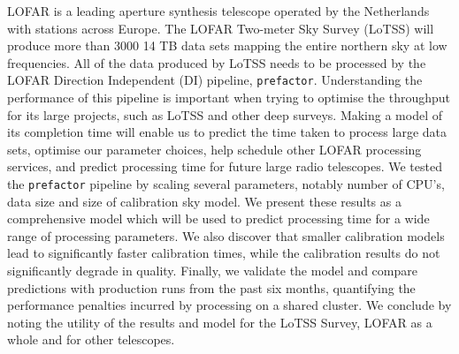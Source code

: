 
LOFAR is a leading aperture synthesis telescope operated by the Netherlands with stations across Europe. The LOFAR Two-meter Sky Survey (LoTSS) will produce more than 3000 14 TB data sets mapping the entire northern sky at low frequencies. All of the data produced by LoTSS needs to be processed by the LOFAR Direction Independent (DI) pipeline, \texttt{prefactor}. Understanding the performance of this pipeline is important when trying to optimise the throughput for its large projects, such as LoTSS and other deep surveys. Making a model of its completion time will enable us to predict the time taken to process large data sets, optimise our parameter choices, help schedule other LOFAR processing services, and predict processing time for future large radio telescopes. We tested the \texttt{prefactor} pipeline by scaling several parameters, notably number of CPU's, data size and size of calibration sky model. We present these results as a comprehensive model which will be used to predict processing time for a wide range of processing parameters. We also discover that smaller calibration models lead to significantly faster calibration times, while the calibration results do not significantly degrade in quality. Finally, we validate the model and compare predictions with production runs from the past six months, quantifying the performance penalties incurred by processing on a shared cluster. We conclude by noting the utility of the results and model for the LoTSS Survey, LOFAR as a whole and for other telescopes. 



